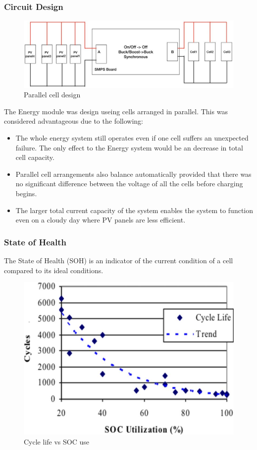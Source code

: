 \documentclass[11pt, a4paper]{article}
\begin{document}
\pagebreak
\subsubsection{Circuit Design}

\begin{figure} [h!]
    \centering
    \includegraphics[scale=0.5]{Energy_parallel.JPG}
    \caption{Parallel cell design}
\end{figure}
The Energy module was design useing cells arranged in parallel. This was considered advantageous due to the following:
\begin{itemize}
    \item The whole energy system still operates even if one cell suffers an unexpected failure. The only effect to the Energy system would be an decrease in total cell capacity.
    \item Parallel cell arrangements also balance automatically provided that there was no significant difference between the voltage of all the cells before charging begins.
    \item The larger total current capacity of the system enables the system to function even on a cloudy day where PV panels are less efficient.
\end{itemize}

\subsubsection{State of Health}

The State of Health (SOH) is an indicator of the current condition of a cell compared to its ideal conditions. 
\begin{figure} [h!]
    \centering
    \includegraphics[scale=0.4]{Energy_SOH.JPG}
    \caption{Cycle life vs SOC use \cite{SOH}}
\end{figure}
\end{document}
